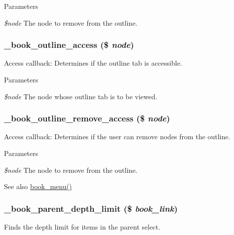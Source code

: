 \begin{DoxyParams}{Parameters}
\item[{\em \$node}]The node to remove from the outline. \end{DoxyParams}
\hypertarget{book_8module_a58f4f20ccdccc01d00a743f3f460f50b}{
\subsubsection[{\_\-book\_\-outline\_\-access}]{\setlength{\rightskip}{0pt plus 5cm}\_\-book\_\-outline\_\-access (\$ {\em node})}}
\label{book_8module_a58f4f20ccdccc01d00a743f3f460f50b}
Access callback: Determines if the outline tab is accessible.


\begin{DoxyParams}{Parameters}
\item[{\em \$node}]The node whose outline tab is to be viewed. \end{DoxyParams}
\hypertarget{book_8module_a9dc2dc631b3b6fb63f5eca58c8951cfb}{
\subsubsection[{\_\-book\_\-outline\_\-remove\_\-access}]{\setlength{\rightskip}{0pt plus 5cm}\_\-book\_\-outline\_\-remove\_\-access (\$ {\em node})}}
\label{book_8module_a9dc2dc631b3b6fb63f5eca58c8951cfb}
Access callback: Determines if the user can remove nodes from the outline.


\begin{DoxyParams}{Parameters}
\item[{\em \$node}]The node to remove from the outline.\end{DoxyParams}
\begin{DoxySeeAlso}{See also}
\hyperlink{book_8module_adc2bbd5235a769fa1ae9b02e8effc15e}{book\_\-menu()} 
\end{DoxySeeAlso}
\hypertarget{book_8module_a39e03999837b65e5a74906dd1f897850}{
\subsubsection[{\_\-book\_\-parent\_\-depth\_\-limit}]{\setlength{\rightskip}{0pt plus 5cm}\_\-book\_\-parent\_\-depth\_\-limit (\$ {\em book\_\-link})}}
\label{book_8module_a39e03999837b65e5a74906dd1f897850}
Finds the depth limit for items in the parent select.


